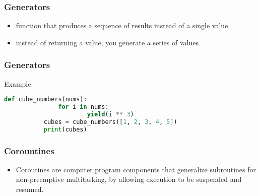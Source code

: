 \documentclass[14pt]{beamer}
\begin{document}
    \begin{frame}
        \frametitle{Generators}
        \begin{itemize}
            \item function that produces a sequence of results instead of a single value
            \item instead of returning a value, you generate a series of values
        \end{itemize}
    \end{frame}
    \begin{frame}[containsverbatim]
        \frametitle{Generators}
        \alert{Example:}
        \begin{lstlisting}[language=Python]
           def cube_numbers(nums):
               for i in nums:
                       yield(i ** 3)
           cubes = cube_numbers([1, 2, 3, 4, 5])
           print(cubes)
        \end{lstlisting}
    \end{frame}
    \begin{frame}
        \frametitle{Corountines}
        \begin{itemize}
            \item Coroutines are computer program components that generalize subroutines for non-preemptive multitasking, by allowing execution to be suspended and resumed.
        \end{itemize}
    \end{frame}
\end{document}
